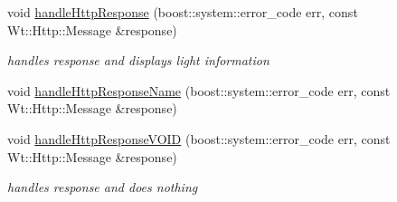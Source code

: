 \begin{DoxyCompactItemize}
void \hyperlink{classLightsControlWidget_a0fd696e3500ca64cfeddd08738e5b6cf}{handle\+Http\+Response} (boost\+::system\+::error\+\_\+code err, const Wt\+::\+Http\+::\+Message \&response)
\begin{DoxyCompactList}\small\item\em handles response and displays light information \end{DoxyCompactList}\item 
void \hyperlink{classLightsControlWidget_ace0f0ce6387f25f695ac83a46a765a74}{handle\+Http\+Response\+Name} (boost\+::system\+::error\+\_\+code err, const Wt\+::\+Http\+::\+Message \&response)
\item 
void \hyperlink{classLightsControlWidget_a9cc86543ee2df1d0bb09c35b0e2fac90}{handle\+Http\+Response\+V\+O\+ID} (boost\+::system\+::error\+\_\+code err, const Wt\+::\+Http\+::\+Message \&response)
\begin{DoxyCompactList}\small\item\em handles response and does nothing \end{DoxyCompactList}\end{DoxyCompactItemize}
